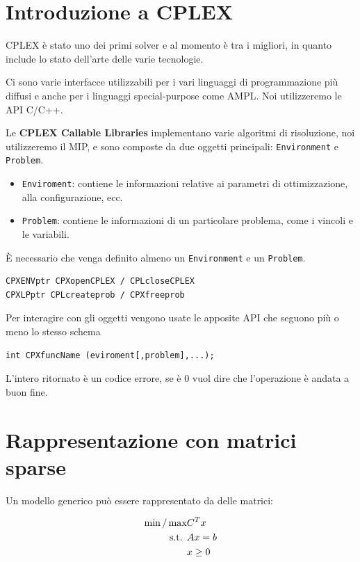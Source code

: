 \section{Introduzione a CPLEX}

CPLEX è stato uno dei primi solver e al momento è tra i migliori, in quanto include lo stato dell'arte delle varie tecnologie.

Ci sono varie interfacce utilizzabili per i vari linguaggi di programmazione più diffusi e anche per i linguaggi special-purpose come AMPL. Noi utilizzeremo le API C/C++.

Le \textbf{CPLEX Callable Libraries} implementano varie algoritmi di risoluzione, noi utilizzeremo il MIP, e sono composte da due oggetti principali: \texttt{Environment} e \texttt{Problem}.

\begin{itemize}
	\item \texttt{Enviroment}: contiene le informazioni relative ai parametri di ottimizzazione, alla configurazione, ecc.
	\item \texttt{Problem}: contiene le informazioni di un particolare problema, come i vincoli e le variabili.
\end{itemize}

\noindent\`E necessario che venga definito almeno un \texttt{Environment} e un \texttt{Problem}.

\begin{verbatim}
CPXENVptr CPXopenCPLEX / CPLcloseCPLEX
CPXLPptr CPLcreateprob / CPXfreeprob
\end{verbatim}

\noindent Per interagire con gli oggetti vengono usate le apposite API che seguono più o meno lo stesso schema

\begin{verbatim}
int CPXfuncName (eviroment[,problem],...);
\end{verbatim}

\noindent L'intero ritornato è un codice errore, se è 0 vuol dire che l'operazione è andata a buon fine.

\section{Rappresentazione con matrici sparse}

Un modello generico può essere rappresentato da delle matrici:

\begin{align*}
\min/\max & C^T x \\
\text{s.t. } & A x = b \\
	& x \geq 0
\end{align*}

